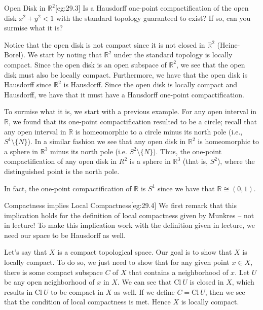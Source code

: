 \begin{egBox}{Open Disk in \( \mathbb{R}^{ 2 } \)}[eg:29.3]
    Is a Hausdorff one-point compactification of the open disk
    \( x^{ 2 } + y^{ 2 } < 1 \) with the standard topology guaranteed to exist?
    If so, can you surmise what it is?

    \baseSkip

    Notice that the open disk is not compact since it is not closed in 
    \( \mathbb{R}^{ 2 } \) (Heine-Borel).
    We start by noting that \( \mathbb{R}^{ 2 } \) under the standard topology
    is locally compact.
    Since the open disk is an open subspace of \( \mathbb{R}^{ 2 } \), we see 
    that the open disk must also be locally compact.
    Furthermore, we have that the open disk is Hausdorff since 
    \( \mathbb{R}^{ 2 } \) is Hausdorff.
    Since the open disk is locally compact and Hausdorff, we have that it must
    have a Hausdorff one-point compactification.

    \baseSkip

    To surmise what it is, we start with a previous example.
    For any open interval in \( \mathbb{R} \), we found that its one-point
    compactification resulted to be a circle; recall that any open interval
    in \( \mathbb{R} \) is homeomorphic to a circle minus its north pole 
    (i.e., \( S^{ 1 } \setminus \{ N \} \)).
    In a similar fashion we see that any open disk in \( \mathbb{R}^{ 2 } \)
    is homeomorphic to a sphere in \( \mathbb{R}^{ 3 } \) minus its north pole 
    (i.e. \( S^{ 2 } \setminus \{ N \} \)).
    Thus, the one-point compactification of any open disk in \( R^{ 2 } \)
    is a sphere in \( \mathbb{R}^{ 3 } \) (that is, \( S^{ 2 } \)), where the
    distinguished point is the north pole.

    \baseSkip

    In fact, the one-point compactification of \( \mathbb{R} \) is \( S^{ 1 } \)
    since we have that \( \mathbb{R} \cong ( 0, 1 ) \).
\end{egBox}

\begin{egBox}{Compactness implies Local Compactness}[eg:29.4]
    We first remark that this implication holds for the definition of local 
    compactness given by Munkres -- not in lecture!
    To make this implication work with the definition given in lecture, we need our 
    space to be Hausdorff as well.

    \baseSkip 

    Let's say that \( X \) is a compact topological space. 
    Our goal is to show that \( X \) is locally compact. 
    To do so, we just need to show that for any given point \( x \in X \), there 
    is some compact subspace \( C \) of \( X \) that contains a neighborhood of \( x \).
    Let \( U \) be any open neighborhood of \( x \) in \( X \). 
    We can see that \( \mathrm{Cl} \ U \) is closed in \( X \), which results in 
    \( \mathrm{Cl} \ U \) to be compact in \( X \) as well.
    If we define \( C = \mathrm{Cl} \ U \), then we see that the condition of local 
    compactness is met. 
    Hence \( X \) is locally compact.
\end{egBox}

